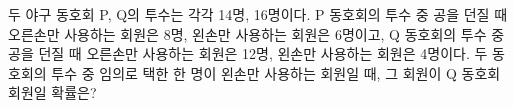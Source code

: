 두 야구 동호회 P, Q의 투수는 각각 14명, 16명이다. P 동호회의 투수 중 공을 던질 때 오른손만 사용하는 회원은 8명, 왼손만 사용하는 회원은 6명이고, Q 동호회의 투수 중 공을 던질 때 오른손만 사용하는 회원은 12명, 왼손만 사용하는 회원은 4명이다. 두 동호회의 투수 중 임의로 택한 한 명이 왼손만 사용하는 회원일 때, 그 회원이 Q 동호회 회원일 확률은?
